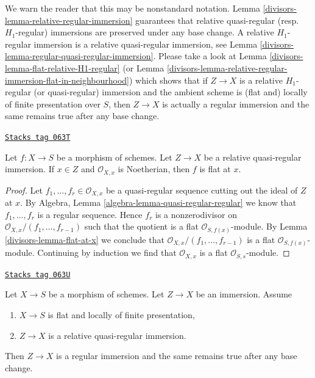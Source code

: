 We warn the reader that this may be nonstandard notation.
Lemma \ref{divisors-lemma-relative-regular-immersion}
guarantees that relative quasi-regular (resp.\ $H_1$-regular)
immersions are preserved under any base change.
A relative $H_1$-regular immersion is a relative quasi-regular immersion, see
Lemma \ref{divisors-lemma-regular-quasi-regular-immersion}.
Please take a look at
Lemma \ref{divisors-lemma-flat-relative-H1-regular}
(or
Lemma \ref{divisors-lemma-relative-regular-immersion-flat-in-neighbourhood})
which shows that if $Z \to X$ is a relative $H_1$-regular
(or quasi-regular) immersion and the ambient scheme is (flat and)
locally of finite presentation over $S$, then $Z \to X$
is actually a regular immersion and the same remains true after
any base change.

\begin{lemma}
\label{divisors-lemma-quasi-regular-immersion-flat-at-x}
\href{https://stacks.math.columbia.edu/tag/063T}{\texttt{Stacks tag 063T}}

Let $f : X \to S$ be a morphism of schemes.
Let $Z \to X$ be a relative quasi-regular immersion.
If $x \in Z$ and $\mathcal{O}_{X, x}$ is Noetherian, then $f$ is flat at $x$.
\end{lemma}

\begin{proof}

Let $f_1, \ldots, f_r \in \mathcal{O}_{X, x}$ be a quasi-regular
sequence cutting out the ideal of $Z$ at $x$. By
Algebra, Lemma \ref{algebra-lemma-quasi-regular-regular}
we know that $f_1, \ldots, f_r$ is a regular sequence.
Hence $f_r$ is a nonzerodivisor on
$\mathcal{O}_{X, x}/(f_1, \ldots, f_{r - 1})$ such that the
quotient is a flat $\mathcal{O}_{S, f(x)}$-module.
By
Lemma \ref{divisors-lemma-flat-at-x}
we conclude that $\mathcal{O}_{X, x}/(f_1, \ldots, f_{r - 1})$
is a flat $\mathcal{O}_{S, f(x)}$-module.
Continuing by induction we find that $\mathcal{O}_{X, x}$
is a flat $\mathcal{O}_{S, s}$-module.
\end{proof}

\begin{lemma}
\label{divisors-lemma-relative-regular-immersion-flat-in-neighbourhood}
\href{https://stacks.math.columbia.edu/tag/063U}{\texttt{Stacks tag 063U}}

Let $X \to S$ be a morphism of schemes.
Let $Z \to X$ be an immersion.
Assume
\begin{enumerate}
\item $X \to S$ is flat and locally of finite presentation,
\item $Z \to X$ is a relative quasi-regular immersion.
\end{enumerate}
Then $Z \to X$ is a regular immersion and
the same remains true after any base change.
\end{lemma}

